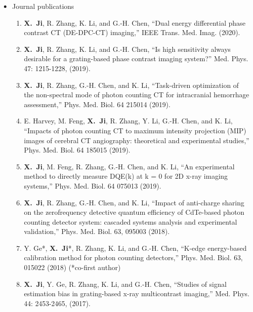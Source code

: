 \documentclass[letterpaper,11pt]{article}
\newcommand{\xji}{\textbf{X.~Ji}}
\begin{document}
\begin{itemize}
\item Journal publications
\begin{enumerate}\justifying
\item \xji, R. Zhang, K. Li, and G.-H. Chen, ``Dual energy differential phase contrast CT (DE-DPC-CT) imaging,'' IEEE Trans. Med. Imag. (2020).
\item \xji, R. Zhang, K. Li, and G.-H. Chen, ``Is high sensitivity always desirable for a grating-based phase contrast imaging system?'' Med. Phys. 47: 1215-1228, (2019).
\item \xji, R. Zhang, G.-H. Chen, and K. Li, ``Task-driven optimization of the non-spectral mode of photon counting CT for intracranial hemorrhage assessment,'' Phys. Med. Biol. 64 215014 (2019).
\item E. Harvey, M. Feng, \xji, R. Zhang, Y. Li, G.-H. Chen, and K. Li, ``Impacts of photon counting CT to maximum intensity projection (MIP) images of cerebral CT angiography: theoretical and experimental studies,'' Phys. Med. Biol. 64 185015 (2019).
\item \xji, M. Feng, R. Zhang, G.-H. Chen, and K. Li, ``An experimental method to directly measure DQE(k) at k = 0 for 2D x-ray imaging systems,'' Phys. Med. Biol. 64 075013 (2019).
\item \xji, R. Zhang, G.-H. Chen, and K. Li, ``Impact of anti-charge sharing on the zerofrequency detective quantum efficiency of CdTe-based photon counting detector system: cascaded systems analysis and experimental validation,'' Phys. Med. Biol. 63, 095003 (2018).
\item Y. Ge*, \xji*, R. Zhang, K. Li, and G.-H. Chen, ``K-edge energy-based calibration method for photon counting detectors,'' Phys. Med. Biol. 63, 015022 (2018) (*co-first author)
\item \xji, Y. Ge, R. Zhang, K. Li, and G.-H. Chen, ``Studies of signal estimation bias in grating-based x-ray multicontrast imaging,'' Med. Phys. 44: 2453-2465, (2017).
\end{enumerate}


\end{itemize}
\end{document}
